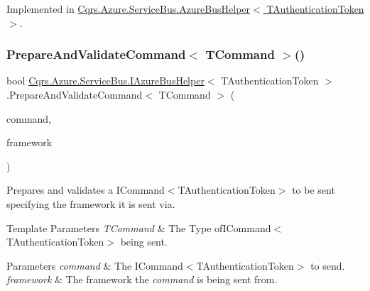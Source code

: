 Implemented in \hyperlink{classCqrs_1_1Azure_1_1ServiceBus_1_1AzureBusHelper_a0139f99e393214427b9a711bf27cae40_a0139f99e393214427b9a711bf27cae40}{Cqrs.\+Azure.\+Service\+Bus.\+Azure\+Bus\+Helper$<$ T\+Authentication\+Token $>$}.

\mbox{\label{interfaceCqrs_1_1Azure_1_1ServiceBus_1_1IAzureBusHelper_a283ee2cf9241a5364dd5569a9f12fa10_a283ee2cf9241a5364dd5569a9f12fa10}} 
\subsubsection{\texorpdfstring{Prepare\+And\+Validate\+Command$<$ T\+Command $>$()}{PrepareAndValidateCommand< TCommand >()}}
{\footnotesize\ttfamily bool \hyperlink{interfaceCqrs_1_1Azure_1_1ServiceBus_1_1IAzureBusHelper}{Cqrs.\+Azure.\+Service\+Bus.\+I\+Azure\+Bus\+Helper}$<$ T\+Authentication\+Token $>$.Prepare\+And\+Validate\+Command$<$ T\+Command $>$ (\begin{DoxyParamCaption}\item[{T\+Command}]{command,  }\item[{string}]{framework }\end{DoxyParamCaption})}



Prepares and validates a I\+Command$<$\+T\+Authentication\+Token$>$ to be sent specifying the framework it is sent via. 


\begin{DoxyTemplParams}{Template Parameters}
{\em T\+Command} & The Type ofI\+Command$<$\+T\+Authentication\+Token$>$ being sent.\\
\hline
\end{DoxyTemplParams}

\begin{DoxyParams}{Parameters}
{\em command} & The I\+Command$<$\+T\+Authentication\+Token$>$ to send.\\
\hline
{\em framework} & The framework the {\itshape command}  is being sent from.\\
\hline
\end{DoxyParams}


